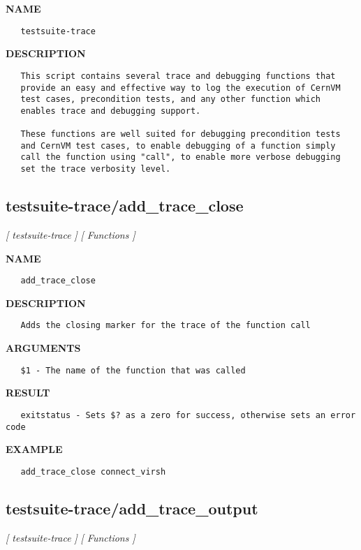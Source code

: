 \label{ch:robo43}
\label{ch:test_suite_testsuite_trace}
\textbf{NAME}
\begin{verbatim}
   testsuite-trace
\end{verbatim}
\textbf{DESCRIPTION}
\begin{verbatim}
   This script contains several trace and debugging functions that
   provide an easy and effective way to log the execution of CernVM
   test cases, precondition tests, and any other function which
   enables trace and debugging support.

   These functions are well suited for debugging precondition tests
   and CernVM test cases, to enable debugging of a function simply
   call the function using "call", to enable more verbose debugging
   set the trace verbosity level.
\end{verbatim}
\newpage
\subsection{testsuite-trace/add\_trace\_close}
\textsl{[ testsuite-trace ]}
\textsl{[ Functions ]}

\label{ch:robo46}
\label{ch:testsuite_trace_add_trace_close}
\textbf{NAME}
\begin{verbatim}
   add_trace_close
\end{verbatim}
\textbf{DESCRIPTION}
\begin{verbatim}
   Adds the closing marker for the trace of the function call
\end{verbatim}
\textbf{ARGUMENTS}
\begin{verbatim}
   $1 - The name of the function that was called
\end{verbatim}
\textbf{RESULT}
\begin{verbatim}
   exitstatus - Sets $? as a zero for success, otherwise sets an error code
\end{verbatim}
\textbf{EXAMPLE}
\begin{verbatim}
   add_trace_close connect_virsh
\end{verbatim}
\newpage
\subsection{testsuite-trace/add\_trace\_output}
\textsl{[ testsuite-trace ]}
\textsl{[ Functions ]}

